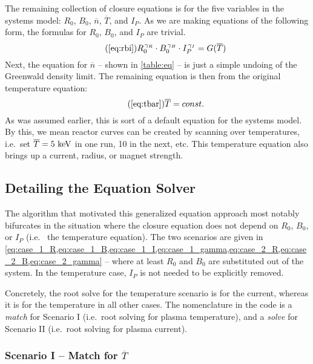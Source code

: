 The remaining collection of closure equations is for the five  variables in the systems model: $R_0$, $B_0$, $\overline n$, $\overline T$, and $I_P$. As we are making equations of the following form, the formulas for $R_0$, $B_0$, and $I_P$ are trivial.
\begin{equation}
	\tag{\ref{eq:rbi}}
	R_0^{\, \gamma_R} \cdot B_0^{\, \gamma_B} \cdot I_P^{\, \gamma_I} = G( \overline T )
\end{equation}
Next, the equation for $\overline n$ -- shown in \cref{table:eq} -- is just a simple undoing of the Greenwald density limit. The remaining equation is then from the original temperature equation:
\begin{equation}
	\tag{\ref{eq:tbar}}
	\overline T = const.
\end{equation}
As was assumed earlier, this is sort of a default equation for the systems model. By this, we mean reactor curves can be created by scanning over temperatures, i.e.\ set $\overline T = 5 \ \textnormal{keV}$ in one run, 10 in the next, etc. This temperature equation also brings up a  current, radius, or magnet strength. 

\subsection{Detailing the Equation Solver}

The algorithm that motivated this generalized equation approach most notably bifurcates in the situation where the closure equation does not depend on $R_0$, $B_0$, or $I_P$ (i.e.\  the temperature equation). The two scenarios are given in \cref{eq:case_1_R,eq:case_1_B,eq:case_1_I,eq:case_1_gamma,eq:case_2_R,eq:case_2_B,eq:case_2_gamma} -- where at least $R_0$ and $B_0$ are substituted out of the system. In the temperature case, $I_P$ is not needed to be explicitly removed. 

Concretely, the root solve for the temperature  scenario is for the current, whereas it is for the temperature in all other cases. The nomenclature in the code is a \emph{match} for Scenario I (i.e.\ root solving for plasma temperature), and a \emph{solve} for Scenario II (i.e.\ root solving for plasma current).

\subsubsection{Scenario I -- Match for $\overline T$}

